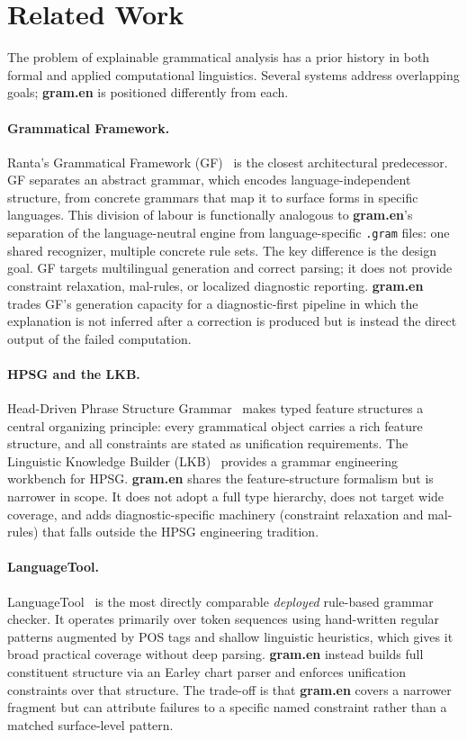 \documentclass[11pt]{article}
\theoremstyle{definition}
\theoremstyle{plain}
\theoremstyle{remark}
\newcommand{\Gram}{\textbf{gram.en}}
\begin{document}
\section{Related Work}
\label{sec:relatedwork}

The problem of explainable grammatical analysis has a prior history in both formal and
applied computational linguistics. Several systems address overlapping goals; \Gram{} is
positioned differently from each.

\paragraph{Grammatical Framework.}
Ranta's Grammatical Framework (GF)~\cite{ranta2004gf} is the closest architectural
predecessor. GF separates an abstract grammar, which encodes language-independent
structure, from concrete grammars that map it to surface forms in specific languages.
This division of labour is functionally analogous to \Gram{}'s separation of the
language-neutral engine from language-specific \texttt{.gram} files: one shared
recognizer, multiple concrete rule sets. The key difference is the design goal. GF
targets multilingual generation and correct parsing; it does not provide
constraint relaxation, mal-rules, or localized diagnostic reporting. \Gram{} trades
GF's generation capacity for a diagnostic-first pipeline in which the explanation is not
inferred after a correction is produced but is instead the direct output of the failed
computation.

\paragraph{HPSG and the LKB.}
Head-Driven Phrase Structure Grammar~\cite{pollard1994hpsg} makes typed feature
structures a central organizing principle: every grammatical object carries a rich feature
structure, and all constraints are stated as unification requirements. The Linguistic
Knowledge Builder (LKB)~\cite{copestake2002lkb} provides a grammar engineering workbench
for HPSG. \Gram{} shares the feature-structure formalism but is narrower in scope. It
does not adopt a full type hierarchy, does not target wide coverage, and adds
diagnostic-specific machinery (constraint relaxation and mal-rules) that falls outside
the HPSG engineering tradition.

\paragraph{LanguageTool.}
LanguageTool~\cite{milkowski2010languagetool} is the most directly comparable
\emph{deployed} rule-based grammar checker. It operates primarily over token sequences
using hand-written regular patterns augmented by POS tags and shallow linguistic
heuristics, which gives it broad practical coverage without deep parsing. \Gram{} instead
builds full constituent structure via an Earley chart parser and enforces unification
constraints over that structure. The trade-off is that \Gram{} covers a narrower fragment
but can attribute failures to a specific named constraint rather than a matched
surface-level pattern.
\end{document}
